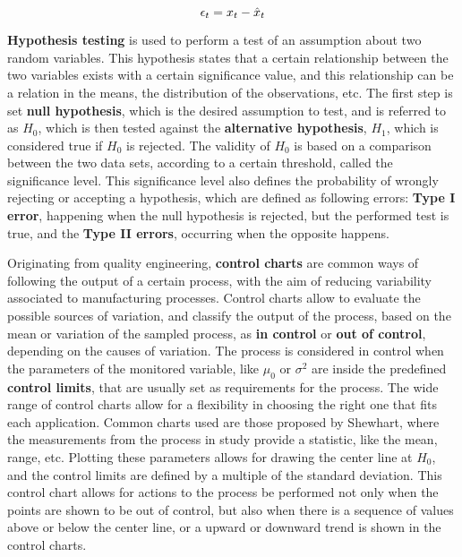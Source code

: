 \begin {equation*}
\centering
\epsilon_t = x_t - \hat{x}_t
\end {equation*}

\par \textbf{Hypothesis testing} is used to perform a test of an assumption about two random variables. This hypothesis states that a certain relationship between the two variables exists with a certain significance value, and this
relationship can be a relation in the means, the distribution of the observations, etc. The first step is set \textbf{null hypothesis}, which is the desired assumption to test, and is referred to as $H_0$, which is then tested
against the \textbf{alternative hypothesis}, $H_1$, which is considered true if $H_0$ is rejected. The validity of $H_0$ is based on a comparison between the two data sets, according to a certain threshold, called the significance
level. This significance level also defines the probability of wrongly rejecting or accepting a hypothesis, which are defined as following errors: \textbf{Type I error}, happening when the null hypothesis is rejected, but the 
performed test is true, and the \textbf{Type II errors}, occurring when the opposite happens.

\par Originating from quality engineering, \textbf{control charts} are common ways of following the output of a certain process, with the aim of reducing variability associated to manufacturing processes. Control charts allow to 
evaluate the possible sources of variation, and classify the output of the process, based on the mean or variation of the sampled process, as \textbf{in control} or \textbf{out of control}, depending on the causes of variation. 
The process is considered in control when the parameters of the monitored variable, like $\mu_0$ or $\sigma^2$ are inside the predefined \textbf{control limits}, that are usually set as requirements for the process.
The wide range of control charts allow for a flexibility in choosing the right one that fits each application. Common charts used are those proposed by Shewhart, where the measurements from the process in study provide a 
statistic, like the mean, range, etc. Plotting these parameters allows for drawing the center line at $H_0$, and the control limits are defined by a multiple of the standard deviation. This control chart allows for 
actions to the process be performed not only when the points are shown to be out of control, but also when there is a sequence of values above or below the center line, or a upward or downward trend is shown in the control charts.


